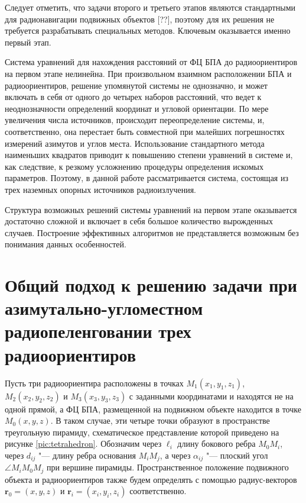 \documentclass[a4paper,12pt]{article}
\begin{document}
Следует отметить, что задачи второго и третьего этапов являются стандартными для радионавигации подвижных объектов [??],
поэтому для их решения не требуется разрабатывать специальных методов. Ключевым оказывается именно первый этап.

Система уравнений для нахождения расстояний от ФЦ БПА до радиоориентиров на первом этапе нелинейна. При произвольном взаимном
расположении БПА и радиоориентиров, решение упомянутой системы не однозначно, и может включать в себя от одного
до четырех наборов расстояний, что ведет к неоднозначности определений координат и угловой ориентации. По мере увеличения
числа источников, происходит переопределение системы, и, соответственно, она перестает быть совместной при малейших
погрешностях измерений азимутов и углов места. Использование стандартного метода наименьших квадратов приводит к повышению
степени уравнений в системе и, как следствие, к резкому усложнению процедуры определения искомых параметров. Поэтому, в данной
работе рассматривается система, состоящая из трех наземных опорных источников радиоизлучения.

Структура возможных решений системы уравнений на первом этапе оказывается достаточно сложной и включает в себя большое
количество вырожденных случаев. Построение эффективных алгоритмов не представляется возможным без понимания данных
особенностей.

\section{Общий подход к решению задачи при азимутально-угломестном радиопеленговании трех радиоориентиров}
Пусть три радиоориентира расположены в точках $M_1\left(x_1, y_1, z_1\right)$, $M_2\left(x_2, y_2, z_2\right)$ и
$M_3\left(x_3, y_3, z_3\right)$ с заданными координатами и находятся не на одной прямой, а ФЦ БПА,
размещенной на подвижном объекте находится в точке $M_0\left(x, y, z\right)$. В таком случае, эти четыре точки
образуют в пространстве треугольную пирамиду, схематическое представление которой приведено на рисунке
\ref{pic:tetrahedron}. Обозначим через $\ell_i$ длину бокового ребра $M_0M_i$, через $d_{ij}$ "--- длину
ребра основания $M_iM_j$, а через $\alpha_{ij}$ "--- плоский угол $\angle M_iM_0M_j$ при вершине пирамиды.
Пространственное положение подвижного объекта и радиоориентиров также будем определять с помощью радиус-векторов
$\mathbf{r}_0 = \left(x, y, z\right)$ и $\mathbf{r}_i = \left(x_i, y_i, z_i\right)$ соответственно.
\end{document}

